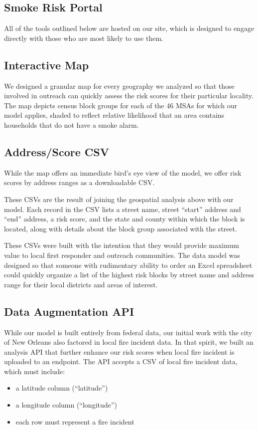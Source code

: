 \documentclass{sig-alternate}
\begin{document}
\subsection{Smoke Risk Portal}

All of the tools outlined below are hosted on our site, which is designed to engage directly with those who are most likely to use them. 

\subsection{Interactive Map}

We designed a granular map for every geography we analyzed so that those involved in outreach can quickly assess the risk scores for their particular locality. The map depicts census block groups for each of the 46 MSAs for which our model applies, shaded to reflect relative likelihood that an area contains households that do not have a smoke alarm.

\subsection{Address/Score CSV}

While the map offers an immediate bird's eye view of the model, we offer risk scores by address ranges as a downloadable CSV.

These CSVs are the result of joining the geospatial analysis above with our model. Each record in the CSV lists a street name, street ``start'' address and ``end'' address, a risk score, and the state and county within which the block is located, along with details about the block group associated with the street.

These CSVs were built with the intention that they would provide maximum value to local first responder and outreach communities. The data model was designed so that someone with rudimentary ability to order an Excel spreadsheet could quickly organize a list of the highest risk blocks by street name and address range for their local districts and areas of interest.

\subsection{Data Augmentation API}
While our model is built entirely from federal data, our initial work with the city of New Orleans also factored in local fire incident data. In that spirit, we built an analysis API that further enhance our risk scores when local fire incident is uploaded to an endpoint. The API accepts a CSV of local fire incident data, which must include:
\begin{itemize}
\item a latitude column (``latitude'')
\item a longitude column (``longitude'')
\item each row must represent a fire incident
\end{itemize}
\end{document}

